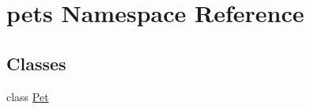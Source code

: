 \hypertarget{namespacepets}{}\section{pets Namespace Reference}
\label{namespacepets}
\subsection*{Classes}
\begin{DoxyCompactItemize}
\item 
class \mbox{\hyperlink{classpets_1_1_pet}{Pet}}
\end{DoxyCompactItemize}
